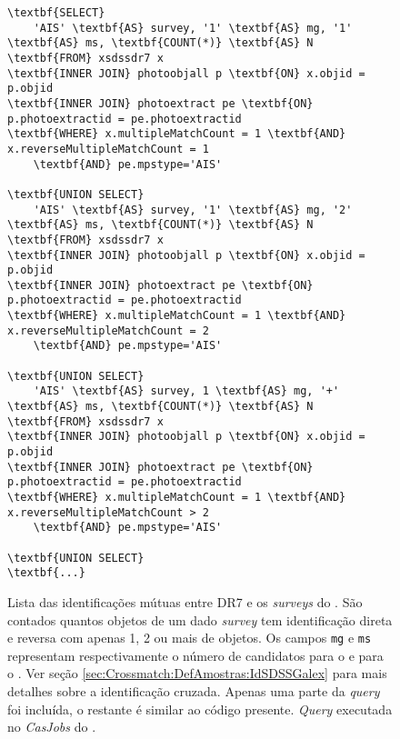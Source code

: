 \begin{figure}
\begin{Verbatim}[frame=single,commandchars=\\\{\}]
\textbf{SELECT}
	'AIS' \textbf{AS} survey, '1' \textbf{AS} mg, '1' \textbf{AS} ms, \textbf{COUNT(*)} \textbf{AS} N
\textbf{FROM} xsdssdr7 x
\textbf{INNER JOIN} photoobjall p \textbf{ON} x.objid = p.objid 
\textbf{INNER JOIN} photoextract pe \textbf{ON} p.photoextractid = pe.photoextractid
\textbf{WHERE} x.multipleMatchCount = 1 \textbf{AND} x.reverseMultipleMatchCount = 1
	\textbf{AND} pe.mpstype='AIS'

\textbf{UNION SELECT}
	'AIS' \textbf{AS} survey, '1' \textbf{AS} mg, '2' \textbf{AS} ms, \textbf{COUNT(*)} \textbf{AS} N
\textbf{FROM} xsdssdr7 x
\textbf{INNER JOIN} photoobjall p \textbf{ON} x.objid = p.objid 
\textbf{INNER JOIN} photoextract pe \textbf{ON} p.photoextractid = pe.photoextractid
\textbf{WHERE} x.multipleMatchCount = 1 \textbf{AND} x.reverseMultipleMatchCount = 2
	\textbf{AND} pe.mpstype='AIS'

\textbf{UNION SELECT}
	'AIS' \textbf{AS} survey, 1 \textbf{AS} mg, '+' \textbf{AS} ms, \textbf{COUNT(*)} \textbf{AS} N
\textbf{FROM} xsdssdr7 x
\textbf{INNER JOIN} photoobjall p \textbf{ON} x.objid = p.objid 
\textbf{INNER JOIN} photoextract pe \textbf{ON} p.photoextractid = pe.photoextractid
\textbf{WHERE} x.multipleMatchCount = 1 \textbf{AND} x.reverseMultipleMatchCount > 2
	\textbf{AND} pe.mpstype='AIS'

\textbf{UNION SELECT}
\textbf{...}
\end{Verbatim}
	\caption[{\em Query} listando identificações entre \SDSS e {\em surveys} do
	\galex.] {Lista das identificações mútuas entre \SDSS DR7 e os {\em surveys}
	do \galex. São contados quantos objetos de um dado {\em survey} tem
	identificação direta e reversa com apenas 1, 2 ou mais de objetos. Os campos
	\texttt{mg} e \texttt{ms} representam respectivamente o número de candidatos
	para o \galex e para o \SDSS. Ver seção
	\ref{sec:Crossmatch:DefAmostras:IdSDSSGalex} para mais detalhes sobre a
	identificação cruzada. Apenas uma parte da {\em query} foi incluída, o
	restante é similar ao código presente. {\em Query} executada no {\em CasJobs}
	do \galex.}
	\label{fig:QueryIDGalexSDSS}
\end{figure}


